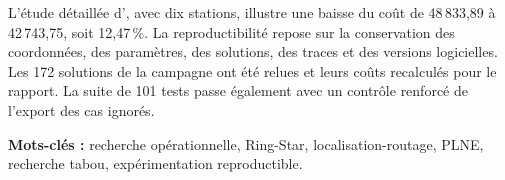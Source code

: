 L'étude détaillée d', avec dix stations, illustre une baisse du coût
de 48\,833,89 à 42\,743,75, soit 12,47\,\%. La reproductibilité repose sur la
conservation des coordonnées, des paramètres, des solutions, des traces et des
versions logicielles. Les 172 solutions de la campagne ont été relues et leurs
coûts recalculés pour le rapport. La suite de 101 tests passe également avec
un contrôle renforcé de l'export des cas ignorés.

\vspace{3mm}
{\sffamily\small\raggedright\textbf{Mots-clés :} recherche opérationnelle, Ring-Star,
localisation-routage, PLNE, recherche tabou, expérimentation reproductible.\par}
